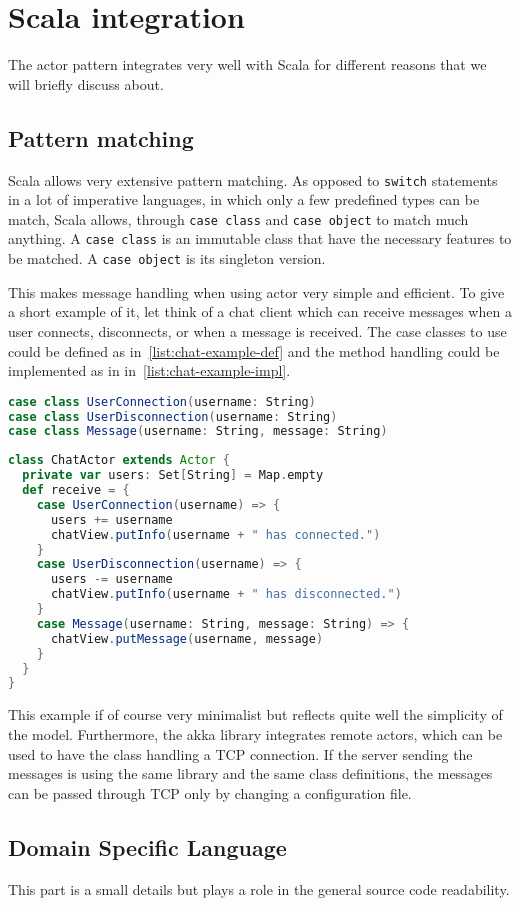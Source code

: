 \section{Scala integration}
The actor pattern integrates very well with Scala for different reasons that 
we will briefly discuss about.
\subsection{Pattern matching}
Scala allows very extensive pattern matching. As opposed to \lstinline{switch} 
statements in a lot of imperative languages, in which only a few predefined types 
can be match, Scala allows, through \lstinline{case class} and \lstinline{case object}
to match much anything. A \lstinline{case class} is an immutable class that have the 
necessary features to be matched. A \lstinline{case object} is its singleton version.

This makes message handling when using actor very simple and efficient. 
To give a short example of it, let think of a chat client which can receive messages 
when a user connects, disconnects, or when a message is received. 
The case classes to use could be defined as in~\ref{list:chat-example-def} and the 
method handling could be implemented as in in~\ref{list:chat-example-impl}.
%
\begin{lstlisting}[basicstyle=\footnotesize,caption=Chat example definitions,label=list:chat-example-def,language=scala]
case class UserConnection(username: String)
case class UserDisconnection(username: String)
case class Message(username: String, message: String)
\end{lstlisting}
%
\begin{lstlisting}[basicstyle=\footnotesize,caption=Chat example implementation,label=list:chat-example-impl,language=scala]
class ChatActor extends Actor {
  private var users: Set[String] = Map.empty
  def receive = {
    case UserConnection(username) => {
      users += username
      chatView.putInfo(username + " has connected.")
    }
    case UserDisconnection(username) => {
      users -= username
      chatView.putInfo(username + " has disconnected.")
    }
    case Message(username: String, message: String) => {
      chatView.putMessage(username, message)
    }
  }
}
\end{lstlisting}
%
This example if of course very minimalist but reflects quite well the simplicity of the 
model. Furthermore, the akka library integrates remote actors, which can be used to have 
the class handling a TCP connection. If the server sending the messages is using the same 
library and the same class definitions, the messages can be passed through TCP only by 
changing a configuration file.
%
\subsection{Domain Specific Language}
This part is a small details but plays a role in the general source code readability.
